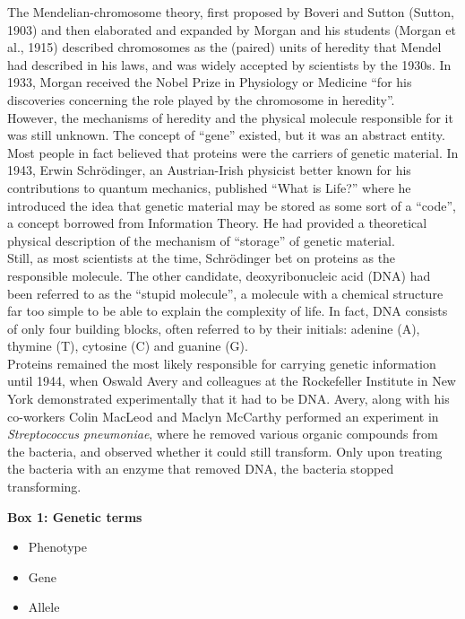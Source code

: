 The Mendelian-chromosome theory, first proposed by Boveri and Sutton (Sutton, 1903) and then elaborated and expanded by Morgan and his students (Morgan et al., 1915) described chromosomes as the (paired) units of heredity that Mendel had described in his laws, and was widely accepted by scientists by the 1930s. 
In 1933, Morgan received the Nobel Prize in Physiology or Medicine “for his discoveries concerning the role played by the chromosome in heredity”.\\

However, the mechanisms of heredity and the physical molecule responsible for it was still unknown. 
The concept of “gene” existed, but it was an abstract entity. 
Most people in fact believed that proteins were the carriers of genetic material. 
In 1943, Erwin  Schrödinger, an Austrian-Irish physicist better known for his contributions to quantum mechanics, published “What is Life?” where he introduced the idea that genetic material may be stored as some sort of a “code”, a concept borrowed from Information Theory. 
He had provided a theoretical physical description of the mechanism of “storage” of genetic material.\\ 

Still, as most scientists at the time, Schrödinger bet on proteins as the responsible molecule. 
The other candidate, deoxyribonucleic acid (DNA) had been referred to as the “stupid molecule”, a molecule with a chemical structure far too simple to be able to explain the complexity of life. 
In fact, DNA consists of only four building blocks, often referred to by their initials: adenine (A), thymine (T), cytosine (C) and guanine (G).\\

Proteins remained the most likely responsible for carrying genetic information until 1944, when Oswald Avery and colleagues at the Rockefeller Institute in New York demonstrated experimentally that it had to be DNA. 
Avery, along with his co-workers Colin MacLeod and Maclyn McCarthy performed an experiment in \textit{Streptococcus pneumoniae}, where he removed various organic compounds from the bacteria, and observed whether it could still transform. 
Only upon treating the bacteria with an enzyme that removed DNA, the bacteria stopped transforming.


\begin{Comment}
\hspace{-2.5mm}\textbf{Box 1: Genetic terms}\label{box1}
\begin{itemize}
    \item Phenotype
    \item Gene
    \item Allele

\end{itemize}


\end{Comment}


